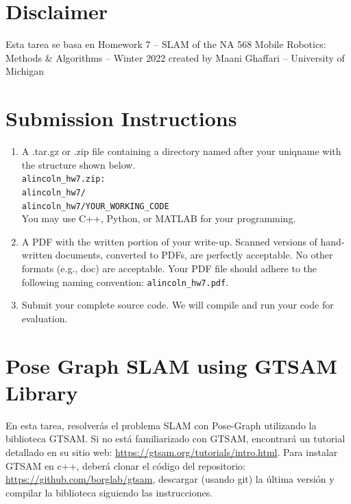 \documentclass[tp]{lcc}
\begin{document}
\maketitle


\section*{Disclaimer}
Esta tarea se basa en Homework 7 -- SLAM of the NA 568 Mobile Robotics: Methods \& Algorithms -- Winter 2022 created by Maani Ghaffari -- University of Michigan

\section*{Submission Instructions}

\begin{enumerate}
    \item A .tar.gz or .zip file containing a directory named after your uniqname with the structure shown below. \\
    \lstinline[style=bash]{alincoln_hw7.zip:} \\
    \lstinline[style=bash]{alincoln_hw7/} \\
    \lstinline[style=bash]{alincoln_hw7/YOUR_WORKING_CODE} \\
    You may use C++, Python, or MATLAB for your programming.

    \item A PDF with the written portion of your write-up. Scanned versions of hand-written documents, converted to PDFs, are perfectly acceptable. No other formats (e.g., doc) are acceptable. Your PDF file should adhere to the following naming convention: \lstinline[style=bash]{alincoln_hw7.pdf}.

    \item Submit your complete source code. We will compile and run your code for evaluation.
\end{enumerate}

\section*{Pose Graph SLAM using GTSAM Library}
En esta tarea, resolverás el problema SLAM con Pose-Graph utilizando la biblioteca GTSAM. Si no está familiarizado con GTSAM, encontrará un tutorial detallado en su sitio web: \url{https://gtsam.org/tutorials/intro.html}. Para instalar GTSAM en c++, deberá clonar el código del repositorio: \url{https://github.com/borglab/gtsam}, descargar (usando git) la última versión y compilar la biblioteca siguiendo las instrucciones.
\end{document}
